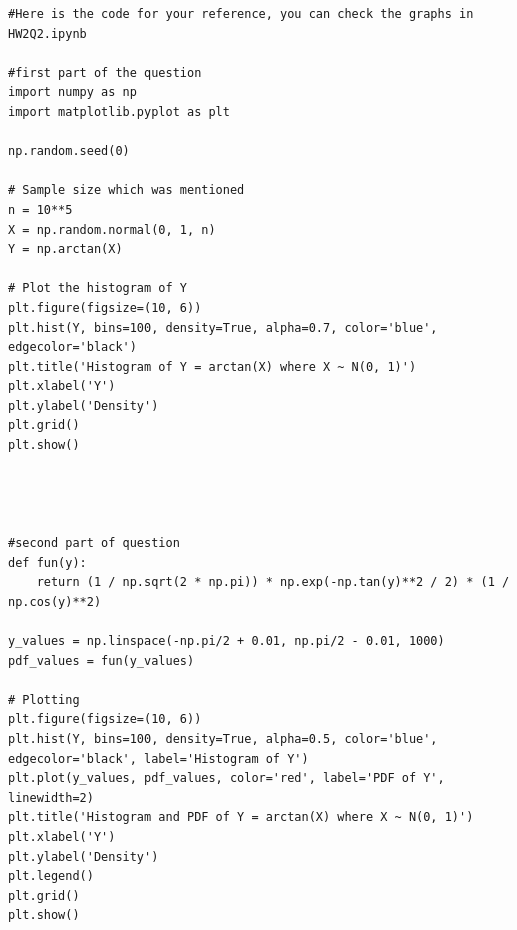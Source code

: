 \documentclass[10pt,letterpaper]{article}
\begin{document}
\lstset{language=Python}
\begin{lstlisting}
#Here is the code for your reference, you can check the graphs in HW2Q2.ipynb

#first part of the question 
import numpy as np
import matplotlib.pyplot as plt

np.random.seed(0)

# Sample size which was mentioned
n = 10**5
X = np.random.normal(0, 1, n)
Y = np.arctan(X)

# Plot the histogram of Y
plt.figure(figsize=(10, 6))
plt.hist(Y, bins=100, density=True, alpha=0.7, color='blue', edgecolor='black')
plt.title('Histogram of Y = arctan(X) where X ~ N(0, 1)')
plt.xlabel('Y')
plt.ylabel('Density')
plt.grid()
plt.show()




#second part of question
def fun(y):
    return (1 / np.sqrt(2 * np.pi)) * np.exp(-np.tan(y)**2 / 2) * (1 / np.cos(y)**2)

y_values = np.linspace(-np.pi/2 + 0.01, np.pi/2 - 0.01, 1000)
pdf_values = fun(y_values)

# Plotting
plt.figure(figsize=(10, 6))
plt.hist(Y, bins=100, density=True, alpha=0.5, color='blue', edgecolor='black', label='Histogram of Y')
plt.plot(y_values, pdf_values, color='red', label='PDF of Y', linewidth=2)
plt.title('Histogram and PDF of Y = arctan(X) where X ~ N(0, 1)')
plt.xlabel('Y')
plt.ylabel('Density')
plt.legend()
plt.grid()
plt.show()
\end{lstlisting}
\end{document}
